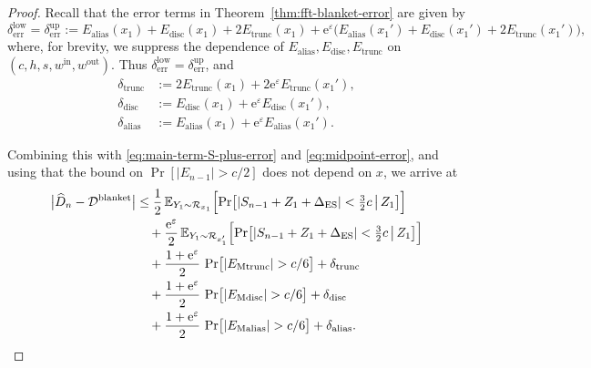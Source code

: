 \documentclass{article}
\theoremstyle{plain}
\theoremstyle{definition}
\begin{document}
\begin{proof}
Recall that the error terms in Theorem~\ref{thm:fft-blanket-error} are
given by
\[
  \delta_{\mathrm{err}}^{\mathrm{low}}=
  \delta_{\mathrm{err}}^{\mathrm{up}}:=
  E_{\mathrm{alias}}(x_1)
  + E_{\mathrm{disc}}(x_1)
  + 2E_{\mathrm{trunc}}(x_1)
  + \mathrm e^\varepsilon\bigl(
    E_{\mathrm{alias}}(x_1')
    + E_{\mathrm{disc}}(x_1')
    + 2E_{\mathrm{trunc}}(x_1')
  \bigr),
\]
where, for brevity, we suppress the dependence of
\(E_{\mathrm{alias}},E_{\mathrm{disc}},E_{\mathrm{trunc}}\) on
\((c,h,s,w^{\mathrm{in}},w^{\mathrm{out}})\).
Thus \(\delta_{\mathrm{err}}^{\mathrm{low}}=\delta_{\mathrm{err}}^{\mathrm{up}}\), and
\begin{align*}
  \delta_{\mathrm{trunc}}
  &:=
  2E_{\mathrm{trunc}}(x_1)
  + 2\mathrm e^\varepsilon E_{\mathrm{trunc}}(x_1'),
  \\
  \delta_{\mathrm{disc}}
  &:=
  E_{\mathrm{disc}}(x_1)
  + \mathrm e^\varepsilon E_{\mathrm{disc}}(x_1'),
  \\
  \delta_{\mathrm{alias}}
  &:=
  E_{\mathrm{alias}}(x_1)
  + \mathrm e^\varepsilon E_{\mathrm{alias}}(x_1').
\end{align*}


Combining this with \eqref{eq:main-term-S-plus-error} and
\eqref{eq:midpoint-error}, and using that the bound on
\(\Pr[|E_{n-1}|>c/2]\) does not depend on \(x\), we arrive at
\begin{align}
  \bigl|\widehat D_n - \mathcal{D}^{\mathrm{blanket}}\bigr|
  &\le
  \frac{1}{2}\,
  \mathbb E_{Y_1\sim\mathcal R_{x_1}}\Bigl[
    \Pr\bigl[
      |S_{n-1} + Z_1 + \Delta_{\mathrm{ES}}|
      < \tfrac{3}{2}c
      \,\big|\,
      Z_1
    \bigr]
  \Bigr]
  \notag\\
  &\quad
  +
  \frac{\mathrm e^\varepsilon}{2}\,
  \mathbb E_{Y_1\sim\mathcal R_{x_1'}}\Bigl[
    \Pr\bigl[
      |S_{n-1} + Z_1 + \Delta_{\mathrm{ES}}|
      < \tfrac{3}{2}c
      \,\big|\,
      Z_1
    \bigr]
  \Bigr]
  \notag\\
  &\quad
  + \frac{1+\mathrm e^\varepsilon}{2}\,
    \Pr\bigl[|E_{\mathrm{Mtrunc}}|>c/6\bigr]
  + \delta_{\mathrm{trunc}}
  \notag\\
  &\quad
  + \frac{1+\mathrm e^\varepsilon}{2}\,
    \Pr\bigl[|E_{\mathrm{Mdisc}}|>c/6\bigr]
  + \delta_{\mathrm{disc}}
  \notag\\
  &\quad
  + \frac{1+\mathrm e^\varepsilon}{2}\,
    \Pr\bigl[|E_{\mathrm{Malias}}|>c/6\bigr]
  + \delta_{\mathrm{alias}}.
  \label{eq:full-error-by-type}
\end{align}


\end{proof}
\end{document}
